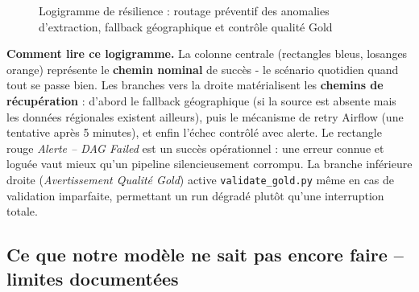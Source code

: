 \documentclass[12pt,a4paper]{report}
\begin{document}
\begin{figure}[htbp]
{}
\caption{Logigramme de résilience : routage préventif des anomalies d'extraction, fallback géographique et contrôle qualité Gold}
\label{fig:logigramme_resilience}
\end{figure}

\textbf{Comment lire ce logigramme.} La colonne centrale (rectangles bleus, losanges orange) représente le \textbf{chemin nominal} de succès - le scénario quotidien quand tout se passe bien. Les branches vers la droite matérialisent les \textbf{chemins de récupération} : d'abord le fallback géographique (si la source est absente mais les données régionales existent ailleurs), puis le mécanisme de retry Airflow (une tentative après 5 minutes), et enfin l'échec contrôlé avec alerte. Le rectangle rouge \textit{Alerte -- DAG Failed} est un succès opérationnel : une erreur connue et loguée vaut mieux qu'un pipeline silencieusement corrompu. La branche inférieure droite (\textit{Avertissement Qualité Gold}) active \texttt{validate\_gold.py} même en cas de validation imparfaite, permettant un run dégradé plutôt qu'une interruption totale.

\subsection{Ce que notre modèle ne sait pas encore faire -- limites documentées}
\end{document}

